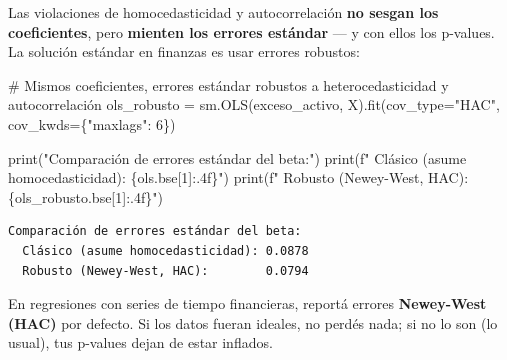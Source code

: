 \documentclass[
  spanish,
  letterpaper,
  DIV=11,
  numbers=noendperiod]{scrreprt}
\newenvironment{Shaded}{\begin{snugshade}}{\end{snugshade}}
\newcommand{\BuiltInTok}[1]{\textcolor[rgb]{0.00,0.23,0.31}{#1}}
\newcommand{\CommentTok}[1]{\textcolor[rgb]{0.37,0.37,0.37}{#1}}
\newcommand{\DecValTok}[1]{\textcolor[rgb]{0.68,0.00,0.00}{#1}}
\newcommand{\NormalTok}[1]{\textcolor[rgb]{0.00,0.23,0.31}{#1}}
\newcommand{\OperatorTok}[1]{\textcolor[rgb]{0.37,0.37,0.37}{#1}}
\newcommand{\SpecialCharTok}[1]{\textcolor[rgb]{0.37,0.37,0.37}{#1}}
\newcommand{\SpecialStringTok}[1]{\textcolor[rgb]{0.13,0.47,0.30}{#1}}
\newcommand{\StringTok}[1]{\textcolor[rgb]{0.13,0.47,0.30}{#1}}
\begin{document}
Las violaciones de homocedasticidad y autocorrelación \textbf{no sesgan
los coeficientes}, pero \textbf{mienten los errores estándar} --- y con
ellos los p-values. La solución estándar en finanzas es usar errores
robustos:

\label{errores-robustos}
\begin{Shaded}
\begin{Highlighting}[]
\CommentTok{\# Mismos coeficientes, errores estándar robustos a heterocedasticidad y autocorrelación}
\NormalTok{ols\_robusto }\OperatorTok{=}\NormalTok{ sm.OLS(exceso\_activo, X).fit(cov\_type}\OperatorTok{=}\StringTok{"HAC"}\NormalTok{, cov\_kwds}\OperatorTok{=}\NormalTok{\{}\StringTok{"maxlags"}\NormalTok{: }\DecValTok{6}\NormalTok{\})}

\BuiltInTok{print}\NormalTok{(}\StringTok{"Comparación de errores estándar del beta:"}\NormalTok{)}
\BuiltInTok{print}\NormalTok{(}\SpecialStringTok{f"  Clásico (asume homocedasticidad): }\SpecialCharTok{\{}\NormalTok{ols}\SpecialCharTok{.}\NormalTok{bse[}\DecValTok{1}\NormalTok{]}\SpecialCharTok{:.4f\}}\SpecialStringTok{"}\NormalTok{)}
\BuiltInTok{print}\NormalTok{(}\SpecialStringTok{f"  Robusto (Newey{-}West, HAC):        }\SpecialCharTok{\{}\NormalTok{ols\_robusto}\SpecialCharTok{.}\NormalTok{bse[}\DecValTok{1}\NormalTok{]}\SpecialCharTok{:.4f\}}\SpecialStringTok{"}\NormalTok{)}
\end{Highlighting}
\end{Shaded}

\begin{verbatim}
Comparación de errores estándar del beta:
  Clásico (asume homocedasticidad): 0.0878
  Robusto (Newey-West, HAC):        0.0794
\end{verbatim}

\begin{tcolorbox}[enhanced jigsaw, bottomrule=.15mm, colback=white, opacitybacktitle=0.6, arc=.35mm, toprule=.15mm, opacityback=0, breakable, titlerule=0mm, left=2mm, coltitle=black, colbacktitle=quarto-callout-tip-color!10!white, colframe=quarto-callout-tip-color-frame, leftrule=.75mm, toptitle=1mm, bottomtitle=1mm, title=\textcolor{quarto-callout-tip-color}{\faLightbulb}\hspace{0.5em}{Regla práctica}, rightrule=.15mm]

En regresiones con series de tiempo financieras, reportá errores
\textbf{Newey-West (HAC)} por defecto. Si los datos fueran ideales, no
perdés nada; si no lo son (lo usual), tus p-values dejan de estar
inflados.

\end{tcolorbox}
\end{document}
